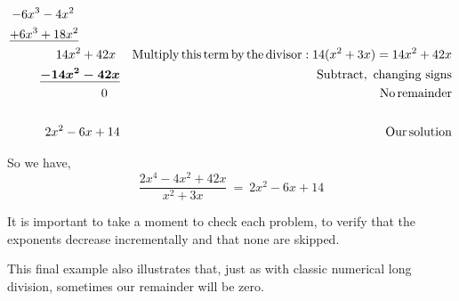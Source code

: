 \begin{example}
\begin{eqnarray*}
    - 6 x^3 - 4 x^2~~~~~~~~~~~ &  & \\
    \underline{+ 6 x^3 + 18 x^2}~~~~~~~~~~  &  & \\
    14 x^2 + 42x~ &  & \operatorname{Multiply} \operatorname{this} \operatorname{term} \operatorname{by} \operatorname{the}
    \operatorname{divisor} : 14 (x^2 + 3x) = 14 x^2 + 42x\\
    \boldsymbol{\underline{- 14 x^2 - 42x}} &  & \operatorname{Subtract,~changing~signs}\\
    0~~~ &  & \operatorname{No} \operatorname{remainder}\\
    &  & \\
    2 x^2 - 6 x + 14 &  & \operatorname{Our} \operatorname{solution}
  \end{eqnarray*}
\end{example}
So we have,
$$\frac{2 x^4 - 4 x^2 + 42x}{x^2+3x}~=~2 x^2 - 6 x + 14$$ 

It is important to take a moment to check each problem, to verify that the
exponents decrease incrementally and that none are skipped. 

This final example also illustrates that, just as with classic numerical long
division, sometimes our remainder will be zero.